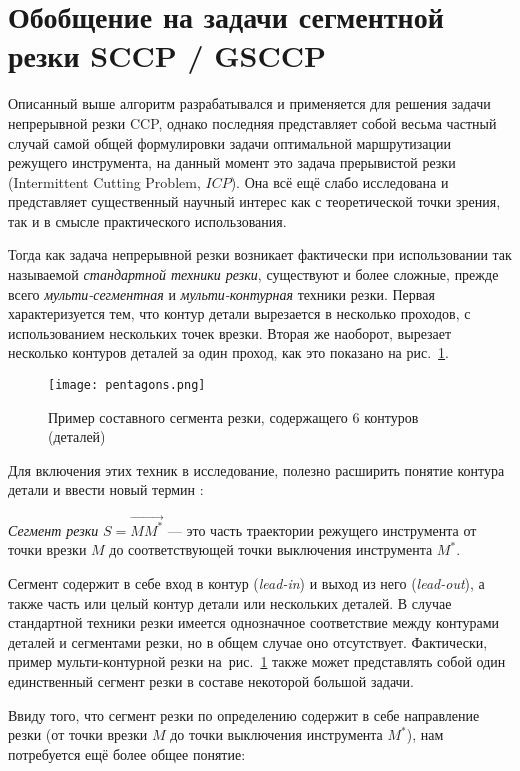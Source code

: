 
\section{Обобщение на задачи сегментной резки SCCP / GSCCP}
\label{sec:ccp.gsccp}

Описанный выше алгоритм разрабатывался и применяется
для решения задачи непрерывной резки CCP,
однако последняя представляет собой весьма
частный случай самой общей формулировки
задачи оптимальной маршрутизации режущего инструмента,
на данный момент это задача прерывистой резки
(Intermittent Cutting Problem, $ICP$).
Она всё ещё слабо исследована
и представляет существенный научный интерес
как с теоретической точки зрения,
так и в смысле практического использования.

Тогда как задача непрерывной резки возникает фактически
при использовании так называемой
\textit{стандартной техники резки},
существуют и более сложные,
прежде всего
\textit{мульти-сегментная}
и
\textit{мульти-контурная}
техники резки.
Первая характеризуется тем,
что контур детали вырезается в несколько проходов,
с использованием нескольких точек врезки.
Вторая же наоборот, вырезает несколько контуров деталей
за один проход,
как это показано на рис.~\ref{fig:ccp-6x5}.

\begin{figure}
  \centering
  \texttt{[image: pentagons.png]}
  \caption{Пример составного сегмента резки, содержащего 6 контуров (деталей)}
  \label{fig:ccp-6x5}
\end{figure}

Для включения этих техник в исследование,
полезно расширить понятие контура детали и ввести новый термин
\cite{bib:petunin-2019}:

\textit{Сегмент резки}
$S = \overrightarrow{M M^*}$
--- это часть траектории режущего инструмента от точки врезки $M$
до соответствующей точки выключения инструмента $M^*$.

Сегмент содержит в себе вход в контур
(\textit{lead-in})
и выход из него
(\textit{lead-out}),
а также часть или целый контур детали
или нескольких деталей.
В случае стандартной техники резки
имеется однозначное соответствие между
контурами деталей и сегментами резки,
но в общем случае оно отсутствует.
Фактически, пример мульти-контурной резки на~рис.~\ref{fig:ccp-6x5}
также может представлять собой один единственный
сегмент резки в составе некоторой большой задачи.

Ввиду того,
что сегмент резки по определению содержит в себе
направление резки
(от точки врезки $M$ до точки выключения инструмента $M^*$),
нам потребуется ещё более общее понятие:

